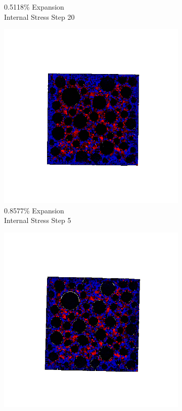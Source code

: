 \begin{figure}[ht!]
\begin{subfigure}{.25\textwidth}
      \caption{0.5118\% Expansion\\Internal Stress Step 20}
    \end{subfigure}

    \begin{subfigure}{.25\textwidth}
      \centering
      \includegraphics[width=1.0\linewidth]{Files/exp_3D/DEF/A30X-5C_4_s5.png}
      \caption{0.8577\% Expansion\\Internal Stress Step 5}
    \end{subfigure}%
    \begin{subfigure}{.25\textwidth}
      \centering
      \includegraphics[width=1.0\linewidth]{Files/exp_3D/DEF/A30X-5C_4_s10.png}

\end{subfigure}
\end{figure}

